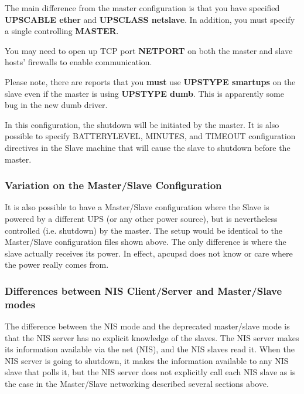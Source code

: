The main difference from the master configuration is that you have
specified \textbf{UPSCABLE ether} and \textbf{UPSCLASS netslave}.  In
addition, you must specify a single controlling \textbf{MASTER}\@.  

You may need to open up TCP port \textbf{NETPORT} on both the master and
slave hosts' firewalls to enable communication.

Please note, there are reports that you {\bf must} use {\bf UPSTYPE smartups}
on the slave even if the master is using {\bf UPSTYPE dumb}. This is
apparently some bug in the new dumb driver.  

In this configuration, the shutdown will be initiated by the master. It is
also possible to specify BATTERYLEVEL, MINUTES, and TIMEOUT configuration
directives in the Slave machine that will cause the slave to shutdown before
the master.

\label{Variation-on-the-Master_002fSlave-Configuration}

\subsubsection*{Variation on the Master/Slave Configuration}

\label{index-Master_002fSlave-variation-80}
It is also possible to have a Master/Slave configuration where the Slave is
powered by a different UPS (or any other power source), but is nevertheless
controlled (i.e.  shutdown) by the master.  The setup would be identical to
the Master/Slave configuration files shown above.  The only difference is
where the slave actually receives its power.  In effect, apcupsd does not know
or care where the power really comes from. 

\subsubsection*{Differences between NIS Client/Server and Master/Slave
modes}

The difference between the NIS mode and the deprecated master/slave mode
is that the NIS server has no explicit knowledge of the slaves. The NIS
server makes its information available via the net (NIS), and the NIS
slaves read it.  When the NIS server is going to shutdown, it makes the
information available to any NIS slave that polls it, but the NIS server
does not explicitly call each NIS slave as is the case in the
Master/Slave networking described several sections above.  

